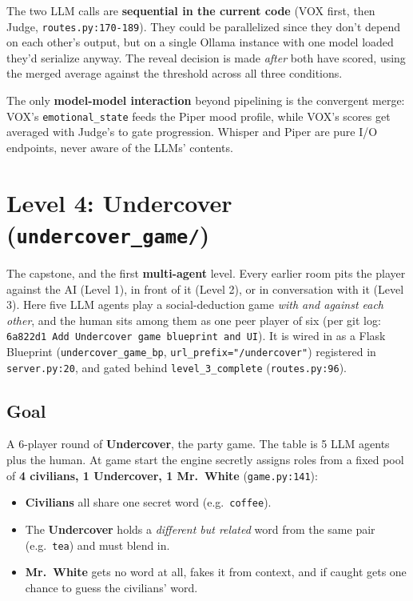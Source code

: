 \documentclass[11pt,a4paper]{article}
\begin{document}
The two LLM calls are \textbf{sequential in the current code} (VOX first, then
Judge, \texttt{routes.py:170-189}). They could be parallelized since they
don't depend on each other's output, but on a single Ollama instance with one
model loaded they'd serialize anyway. The reveal decision is made \emph{after}
both have scored, using the merged average against the threshold across all
three conditions.

The only \textbf{model-model interaction} beyond pipelining is the convergent
merge: VOX's \texttt{emotional\_state} feeds the Piper mood profile, while
VOX's scores get averaged with Judge's to gate progression. Whisper and Piper
are pure I/O endpoints, never aware of the LLMs' contents.

\section{Level 4: Undercover (\texttt{undercover\_game/})}

The capstone, and the first \textbf{multi-agent} level. Every earlier room pits
the player against the AI (Level 1), in front of it (Level 2), or in conversation
with it (Level 3). Here five LLM agents play a social-deduction game \emph{with and
against each other}, and the human sits among them as one peer player of six
(per git log: \texttt{6a822d1 Add Undercover game blueprint and UI}). It is wired
in as a Flask Blueprint (\texttt{undercover\_game\_bp},
\texttt{url\_prefix="/undercover"}) registered in \texttt{server.py:20}, and gated
behind \texttt{level\_3\_complete} (\texttt{routes.py:96}).

\subsection{Goal}
A 6-player round of \textbf{Undercover}, the party game. The table is 5 LLM agents
plus the human. At game start the engine secretly assigns roles from a fixed pool
of \textbf{4 civilians, 1 Undercover, 1 Mr.\ White} (\texttt{game.py:141}):

\begin{itemize}[leftmargin=*,itemsep=3pt]
    \item \textbf{Civilians} all share one secret word (e.g.\ \texttt{coffee}).
    \item The \textbf{Undercover} holds a \emph{different but related} word from
    the same pair (e.g.\ \texttt{tea}) and must blend in.
    \item \textbf{Mr.\ White} gets no word at all, fakes it from context, and if
    caught gets one chance to guess the civilians' word.
\end{itemize}
\end{document}
